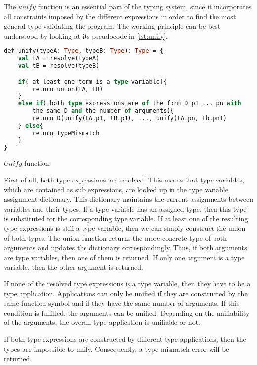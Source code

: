 The $unify$ function is an essential part of the typing system, since it incorporates all constraints imposed by the different expressions in order to find the most general type validating the program.
The working principle can be best understood by looking at its pseudocode in \cref{lst:unify}.
\begin{listing}[!h]
	\begin{CenteredBox}
		\begin{lstlisting}[language=ML,
		commentstyle=\color{black},
		  stringstyle=\color{black},
		  keywordstyle=\color{black}\bfseries,
		  morekeywords={def, return},
		  deletekeywords={type, of, with, and}
		]
def unify(typeA: Type, typeB: Type): Type = {
	val tA = resolve(typeA)
	val tB = resolve(typeB)

	if( at least one term is a type variable){
		return union(tA, tB)
	}
    else if( both type expressions are of the form D p1 ... pn with 
		the same D and the number of arguments){
		return D(unify(tA.p1, tB.p1), ..., unify(tA.pn, tb.pn))
	} else{
		return typeMismatch
	}
}
		\end{lstlisting}
	\end{CenteredBox}
	\caption{$Unify$ function.}
	\label{lst:unify}
\end{listing}

First of all, both type expressions are resolved.
This means that type variables, which are contained as sub expressions, are looked up in the type variable assignment dictionary.
This dictionary maintains the current assignments between variables and their types.
If a type variable has an assigned type, then this type is substituted for the corresponding type variable.
If at least one of the resulting type expressions is still a type variable, then we can simply construct the union of both types.
The union function returns the more concrete type of both arguments and updates the dictionary correspondingly.
Thus, if both arguments are type variables, then one of them is returned.
If only one argument is a type variable, then the other argument is returned.

If none of the resolved type expressions is a type variable, then they have to be a type application.
Applications can only be unified if they are constructed by the same function symbol and if they have the same number of arguments.
If this condition is fulfilled, the arguments can be unified.
Depending on the unifiability of the arguments, the overall type application is unifiable or not.

If both type expressions are constructed by different type applications, then the types are impossible to unify.
Consequently, a type mismatch error will be returned.

